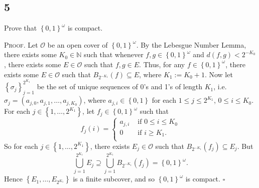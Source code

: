 \documentclass[12pt]{article}
\newcounter{ProofCounter}
\newenvironment{Proof}{\stepcounter{ProofCounter}\textsc{Proof.}}{\hfill$\square$}
\begin{document}
\subsection*{5}
\begin{tcolorbox}
  Prove that $\left\{ 0,1 \right\}^{\omega}$ is compact.
\end{tcolorbox}
\begin{Proof}
  Let $\mathcal{O}$ be an open cover of $\left\{ 0,1 \right\}^{\omega}$. By the Lebesgue Number Lemma, there exists some $K_0 \in \mathbb{N}$ such that
  whenever $f,g \in \left\{ 0,1 \right\}^{\omega}$ and $d(f,g) < 2^{-K_0}$, there exists some $E \in \mathcal{O}$ such that $f,g \in E$. Thus, for any
  $f \in \left\{ 0,1 \right\}^{\omega}$, there exists some $E \in \mathcal{O}$ such that $B_{2^{-K_1}}(f) \subseteq E$, where $K_1 := K_0 + 1$. Now
  let $\left\{ \sigma_{j} \right\}_{j=1}^{2^{K_1}}$ be the set of unique sequences of 0's and 1's of length $K_1$, i.e. $\sigma_{j} = (a_{j,0},
    a_{j,1}, \hdots, a_{j,K_{0}})$, where $a_{j,i} \in \left\{ 0,1 \right\}$ for each $1 \leq j \leq 2^{K_1}$, $0 \leq i \leq K_0$. For each $j \in \left\{
  1, \hdots, 2^{K_1} \right\}$, let $f_j \in \left\{ 0,1 \right\}^{\omega}$ such that 
  \[ f_j(i) = \left\{ \begin{array}{cl}
        a_{j,i} & \text{ if } 0 \leq i \leq K_{0} \\
        0 & \text{ if } i \geq K_{1}. \\
    \end{array} \right. 
  \]
  So for each $j \in \left\{ 1,\hdots, 2^{K_{1}} \right\}$, there exists $E_j \in \mathcal{O}$ such that $B_{2^{-K_{1}}}(f_j) \subseteq E_{j}$.
  But 
  \[ 
    \bigcup_{j=1}^{2^{K_{1}}}E_j \supseteq \bigcup_{j=1}^{2^{K_{1}}}B_{2^{-K_{1}}}(f_j) = \left\{ 0,1 \right\}^{\omega}. 
  \]
  Hence $\left\{ E_1, \hdots, E_{2^{K_{1}}} \right\}$ is a finite subcover, and so $\left\{ 0,1 \right\}^{\omega}$ is compact.
\end{Proof}
\end{document}
